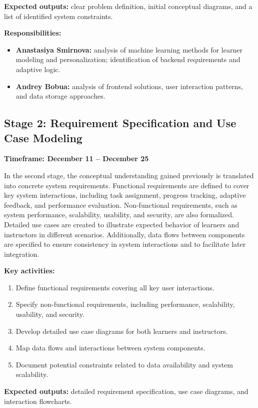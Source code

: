 \documentclass[a4paper,12pt]{extarticle}
\begin{document}
\textbf{Expected outputs:} clear problem definition, initial conceptual diagrams, and a list of identified system constraints.

\textbf{Responsibilities:} 
\begin{itemize}
    \item \textbf{Anastasiya Smirnova:} analysis of machine learning methods for learner modeling and personalization; identification of backend requirements and adaptive logic.
    \item \textbf{Andrey Bobua:} analysis of frontend solutions, user interaction patterns, and data storage approaches.
\end{itemize}

\subsection{Stage 2: Requirement Specification and Use Case Modeling}
\textbf{Timeframe: December 11 -- December 25}

In the second stage, the conceptual understanding gained previously is translated into concrete system requirements. Functional requirements are defined to cover key system interactions, including task assignment, progress tracking, adaptive feedback, and performance evaluation. Non-functional requirements, such as system performance, scalability, usability, and security, are also formalized. Detailed use cases are created to illustrate expected behavior of learners and instructors in different scenarios. Additionally, data flows between components are specified to ensure consistency in system interactions and to facilitate later integration.

\textbf{Key activities:}
\begin{enumerate}
    \item Define functional requirements covering all key user interactions.
    \item Specify non-functional requirements, including performance, scalability, usability, and security.
    \item Develop detailed use case diagrams for both learners and instructors.
    \item Map data flows and interactions between system components.
    \item Document potential constraints related to data availability and system scalability.
\end{enumerate}

\textbf{Expected outputs:} detailed requirement specification, use case diagrams, and interaction flowcharts.
\end{document}

